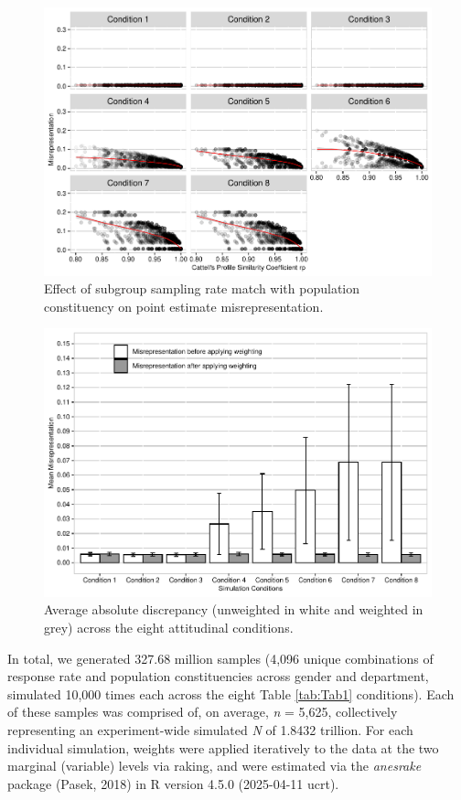 \documentclass[
  man,mask]{apa7}
\begin{document}
\begin{figure}
\centering
\includegraphics{paper_files/figure-latex/Cattell3-1.pdf}
\caption{\label{fig:Cattell3}Effect of subgroup sampling rate match with population constituency on point estimate misrepresentation.}
\end{figure}

\begin{figure}
\centering
\includegraphics{paper_files/figure-latex/Overall4-1.pdf}
\caption{\label{fig:Overall4}Average absolute discrepancy (unweighted in white and weighted in grey) across the eight attitudinal conditions.}
\end{figure}

In total, we generated 327.68 million samples (4,096 unique combinations of response rate and population constituencies across gender and department, simulated 10,000 times each across the eight Table \ref{tab:Tab1} conditions). Each of these samples was comprised of, on average, \emph{n} = 5,625, collectively representing an experiment-wide simulated \emph{N} of 1.8432 trillion. For each individual simulation, weights were applied iteratively to the data at the two marginal (variable) levels via raking, and were estimated via the \emph{anesrake} package (Pasek, 2018) in R version 4.5.0 (2025-04-11 ucrt).
\end{document}
